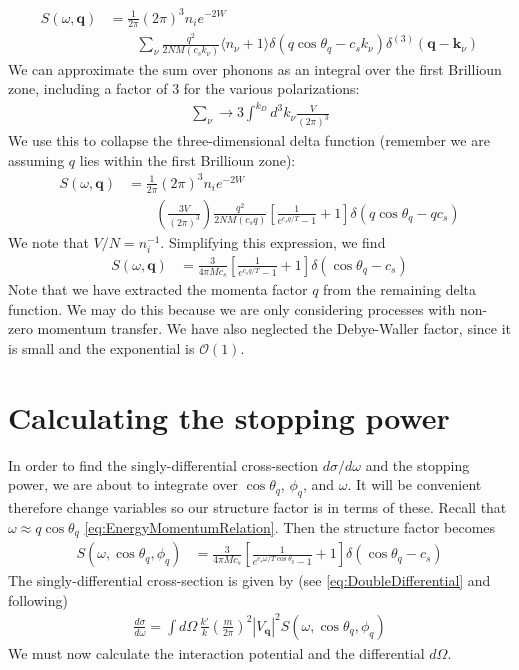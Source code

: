\documentclass{article}
\newcommand{\OO}{\mathcal{O}}
\begin{document}
\begin{align}
S(\omega, \textbf{q}) &= \frac{1}{2 \pi} (2 \pi)^3 n_i e^{-2 W}  \nonumber\\
&\qquad \sum_\nu\frac{q^2}{2 NM (c_sk_\nu)} \langle n_\nu + 1 \rangle \delta(q \cos\theta_{q} - c_sk_\nu) \delta^{(3)}(\textbf{q} - \textbf{k}_\nu)
\end{align}
We can approximate the sum over phonons as an integral over the first Brillioun zone, including a factor of 3 for the various polarizations:
\begin{align}
\sum_\nu \to 3 \int^{k_D} d^3 k_\nu\frac{V}{(2 \pi)^3}  %
\end{align}
We use this to collapse the three-dimensional delta function (remember we are assuming $q$ lies within the first Brillioun zone):
\begin{align}
S(\omega, \textbf{q}) &= \frac{1}{2 \pi} (2 \pi)^3 n_i e^{-2 W}  \nonumber\\
&\qquad \left( \frac{3V}{(2 \pi)^3} \right)\frac{q^2}{2 NM (c_sq)} \left[ \frac{1}{e^{c_sq / T} - 1} + 1 \right] \delta(q\cos\theta_{q} - qc_s)
\end{align}
We note that $V / N = n_i^{-1}$. Simplifying this expression, we find
\begin{align}
S(\omega, \textbf{q}) &= \frac{3}{4 \pi M c_s} \left[ \frac{1}{e^{c_sq / T} - 1} +1 \right] \delta(\cos\theta_{q} - c_s)
\end{align}
Note that we have extracted the momenta factor $q$ from the remaining delta function. We may do this because we are only considering processes with non-zero momentum transfer. We have also neglected the Debye-Waller factor, since it is small and the exponential is $\OO(1)$.

\section{Calculating the stopping power}

In order to find the singly-differential cross-section $d \sigma / d \omega$ and the stopping power, we are about to integrate over $\cos\theta_q$, $\phi_q$, and $\omega$. It will be convenient therefore change variables so our structure factor is in terms of these. Recall that $\omega \approx q \cos\theta_q$ \eqref{eq:EnergyMomentumRelation}. Then the structure factor becomes
\begin{align}
\label{eq:StructureFactorVariableChange}
S(\omega, \cos\theta_q, \phi_q) &= \frac{3}{4 \pi M c_s} \left[ \frac{1}{e^{c_s\omega / T\cos\theta_q} - 1} + 1 \right] \delta(\cos\theta_{q} - c_s)
\end{align}
The singly-differential cross-section is given by (see \eqref{eq:DoubleDifferential} and following)
\begin{align}
\frac{d \sigma}{d \omega} = \int d \Omega\, \frac{k'}{k}\left( \frac{m}{2 \pi} \right)^2 |V_\textbf{q}|^2 S(\omega, \cos\theta_q, \phi_q)
\label{eq:SinglyDifferential}
\end{align}
We must now calculate the interaction potential and the differential $d \Omega$.
\end{document}
